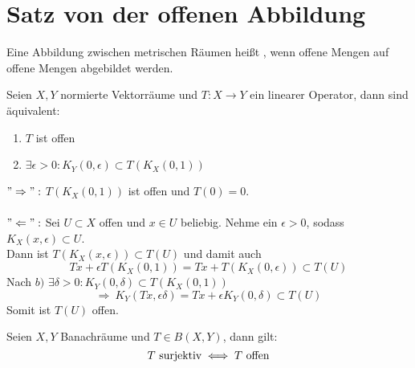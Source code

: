 
\section{Satz von der offenen Abbildung}



\begin{definition} \label{def:10.1-offAbbildung}
	Eine Abbildung zwischen metrischen Räumen heißt , wenn offene Mengen auf offene Mengen abgebildet werden.
\end{definition}


\begin{lemma} \label{lemma:10.2}
	Seien $X, Y$ normierte Vektorräume und $T: X \rightarrow Y$ ein linearer Operator, dann sind äquivalent:
	\begin{enumerate}[label=\alph*\upshape)]
		\item $T$ ist offen
		\item $\exists \epsilon > 0: K_{Y}(0, \epsilon) \subset T(K_{X}(0, 1))$
	\end{enumerate}
\end{lemma}

\begin{beweis}
	$"\Rightarrow":$ $T(K_{X}(0, 1))$ ist offen und $T(0) = 0$. \\ \\
	$"\Leftarrow":$ Sei $U \subset X$ offen und $x \in U$ beliebig. Nehme ein $\epsilon > 0$, sodass $K_{X}(x, \epsilon) \subset U$. \\
	Dann ist $T( K_{X}(x, \epsilon)) \subset T(U)$ und damit auch
	\[ Tx + \epsilon T(K_{X}(0, 1)) = Tx + T(K_{X}(0, \epsilon)) \subset T(U) \]
	Nach $b)$ $\exists \delta > 0: K_{Y}(0, \delta) \subset T(K_{X}(0, 1))$
	\[ \Rightarrow ~ K_{Y}(Tx, \epsilon \delta) = T x + \epsilon K_{Y}(0, \delta) \subset T(U) \]	
	Somit ist $T(U)$ offen.
\end{beweis}


\begin{satz}   \label{satz:10.3-offeneAbbildung}
	Seien $X, Y$ Banachräume und $T \in B(X, Y)$, dann gilt:
	\[ T \text{ surjektiv} \iff T \text{ offen} \]
\end{satz}

